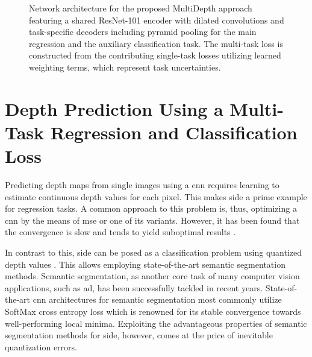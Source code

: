 \documentclass[lang=english]{tumarxivarticle}
\newcommand{\citep}{\parencite}
\begin{document}
\begin{figure}
  \caption{Network architecture for the proposed MultiDepth approach featuring a shared ResNet-101 encoder with dilated convolutions and task-specific decoders including pyramid pooling for the main regression and the auxiliary classification task. The multi-task loss is constructed from the contributing single-task losses utilizing learned weighting terms, which represent task uncertainties.}
  \label{fig:network_architecture}
\end{figure}



\section{Depth Prediction Using a Multi-Task Regression and Classification Loss}

Predicting depth maps from single images using a \gls{cnn} requires learning to estimate continuous depth values for each pixel.
This makes \gls{side} a prime example for regression tasks.
A common approach to this problem is, thus, optimizing a \gls{cnn} by the means of \gls{mse} or one of its variants.
However, it has been found that the convergence is slow and tends to yield suboptimal results \citep{Fu18}.

In contrast to this, \gls{side} can be posed as a classification problem using quantized depth values \citep{Cao18,Gurram18,Fu18}.
This allows employing state-of-the-art semantic segmentation methods.
Semantic segmentation, as another core task of many computer vision applications, such as \gls{ad}, has been successfully tackled in recent years.
State-of-the-art \gls{cnn} architectures for semantic segmentation \citep{Zhao17} most commonly utilize SoftMax cross entropy loss which is renowned for its stable convergence towards well-performing local minima.
Exploiting the advantageous properties of semantic segmentation methods for \gls{side}, however, comes at the price of inevitable quantization errors.
\end{document}
